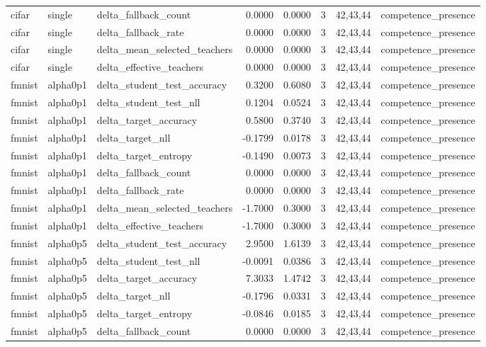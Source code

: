 \begin{tabular}{lllrrrll}
cifar & single & delta\_fallback\_count & 0.0000 & 0.0000 & 3 & 42,43,44 & competence\_presence \\
cifar & single & delta\_fallback\_rate & 0.0000 & 0.0000 & 3 & 42,43,44 & competence\_presence \\
cifar & single & delta\_mean\_selected\_teachers & 0.0000 & 0.0000 & 3 & 42,43,44 & competence\_presence \\
cifar & single & delta\_effective\_teachers & 0.0000 & 0.0000 & 3 & 42,43,44 & competence\_presence \\
fmnist & alpha0p1 & delta\_student\_test\_accuracy & 0.3200 & 0.6080 & 3 & 42,43,44 & competence\_presence \\
fmnist & alpha0p1 & delta\_student\_test\_nll & 0.1204 & 0.0524 & 3 & 42,43,44 & competence\_presence \\
fmnist & alpha0p1 & delta\_target\_accuracy & 0.5800 & 0.3740 & 3 & 42,43,44 & competence\_presence \\
fmnist & alpha0p1 & delta\_target\_nll & -0.1799 & 0.0178 & 3 & 42,43,44 & competence\_presence \\
fmnist & alpha0p1 & delta\_target\_entropy & -0.1490 & 0.0073 & 3 & 42,43,44 & competence\_presence \\
fmnist & alpha0p1 & delta\_fallback\_count & 0.0000 & 0.0000 & 3 & 42,43,44 & competence\_presence \\
fmnist & alpha0p1 & delta\_fallback\_rate & 0.0000 & 0.0000 & 3 & 42,43,44 & competence\_presence \\
fmnist & alpha0p1 & delta\_mean\_selected\_teachers & -1.7000 & 0.3000 & 3 & 42,43,44 & competence\_presence \\
fmnist & alpha0p1 & delta\_effective\_teachers & -1.7000 & 0.3000 & 3 & 42,43,44 & competence\_presence \\
fmnist & alpha0p5 & delta\_student\_test\_accuracy & 2.9500 & 1.6139 & 3 & 42,43,44 & competence\_presence \\
fmnist & alpha0p5 & delta\_student\_test\_nll & -0.0091 & 0.0386 & 3 & 42,43,44 & competence\_presence \\
fmnist & alpha0p5 & delta\_target\_accuracy & 7.3033 & 1.4742 & 3 & 42,43,44 & competence\_presence \\
fmnist & alpha0p5 & delta\_target\_nll & -0.1796 & 0.0331 & 3 & 42,43,44 & competence\_presence \\
fmnist & alpha0p5 & delta\_target\_entropy & -0.0846 & 0.0185 & 3 & 42,43,44 & competence\_presence \\
fmnist & alpha0p5 & delta\_fallback\_count & 0.0000 & 0.0000 & 3 & 42,43,44 & competence\_presence \\

\end{tabular}
